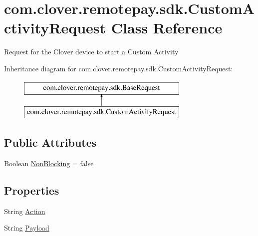 \hypertarget{classcom_1_1clover_1_1remotepay_1_1sdk_1_1_custom_activity_request}{}\section{com.\+clover.\+remotepay.\+sdk.\+Custom\+Activity\+Request Class Reference}
\label{classcom_1_1clover_1_1remotepay_1_1sdk_1_1_custom_activity_request}


Request for the Clover device to start a Custom Activity  


Inheritance diagram for com.\+clover.\+remotepay.\+sdk.\+Custom\+Activity\+Request\+:\begin{figure}[H]
\begin{center}
\leavevmode
\includegraphics[height=2.000000cm]{classcom_1_1clover_1_1remotepay_1_1sdk_1_1_custom_activity_request}
\end{center}
\end{figure}
\subsection*{Public Attributes}
\begin{DoxyCompactItemize}
\item 
Boolean \hyperlink{classcom_1_1clover_1_1remotepay_1_1sdk_1_1_custom_activity_request_a7e5e36c025db3a657191bff1c62a0522}{Non\+Blocking} = false
\end{DoxyCompactItemize}
\subsection*{Properties}
\begin{DoxyCompactItemize}
\item 
String \hyperlink{classcom_1_1clover_1_1remotepay_1_1sdk_1_1_custom_activity_request_ad5b9b21d0dff1a513fab0c91b4e73c10}{Action}
\item 
String \hyperlink{classcom_1_1clover_1_1remotepay_1_1sdk_1_1_custom_activity_request_a90da946f0584992aff1b82e6012877b4}{Payload}
\end{DoxyCompactItemize}
